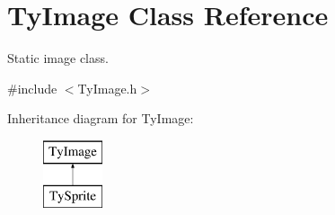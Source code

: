 \hypertarget{class_ty_image}{
\section{TyImage Class Reference}
\label{class_ty_image}
}


Static image class.  




{\ttfamily \#include $<$TyImage.h$>$}

Inheritance diagram for TyImage:\begin{figure}[H]
\begin{center}
\leavevmode
\includegraphics[height=2.000000cm]{class_ty_image}
\end{center}
\end{figure}
